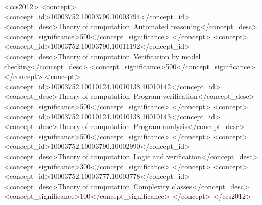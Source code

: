 \documentclass[acmsmall,screen]{acmart}
\begin{document}
\begin{CCSXML}
<ccs2012>
<concept>
<concept_id>10003752.10003790.10003794</concept_id>
<concept_desc>Theory of computation~Automated reasoning</concept_desc>
<concept_significance>500</concept_significance>
</concept>
<concept>
<concept_id>10003752.10003790.10011192</concept_id>
<concept_desc>Theory of computation~Verification by model checking</concept_desc>
<concept_significance>500</concept_significance>
</concept>
<concept>
<concept_id>10003752.10010124.10010138.10010142</concept_id>
<concept_desc>Theory of computation~Program verification</concept_desc>
<concept_significance>500</concept_significance>
</concept>
<concept>
<concept_id>10003752.10010124.10010138.10010143</concept_id>
<concept_desc>Theory of computation~Program analysis</concept_desc>
<concept_significance>500</concept_significance>
</concept>
<concept>
<concept_id>10003752.10003790.10002990</concept_id>
<concept_desc>Theory of computation~Logic and verification</concept_desc>
<concept_significance>300</concept_significance>
</concept>
<concept>
<concept_id>10003752.10003777.10003778</concept_id>
<concept_desc>Theory of computation~Complexity classes</concept_desc>
<concept_significance>100</concept_significance>
</concept>
</ccs2012>
\end{CCSXML}







\maketitle
\end{document}
